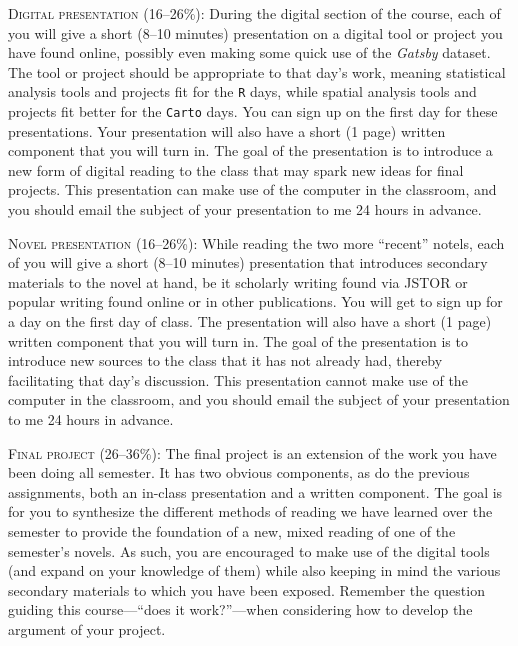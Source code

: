 \begin{description}
  \item \textsc{Digital presentation (16–26\%):} During the digital section of
    the course, each of you will give a short (8–10 minutes) presentation on a
    digital tool or project you have found online, possibly even making some
    quick use of the \textit{Gatsby} dataset. The tool or project should be
    appropriate to that day’s work, meaning statistical analysis tools and
    projects fit for the \texttt{R} days, while spatial analysis tools and
    projects fit better for the \texttt{Carto} days. You can sign up on the
    first day for these presentations. Your presentation will also have a short
    (1 page) written component that you will turn in. The goal of the
    presentation is to introduce a new form of digital reading to the class
    that may spark new ideas for final projects. This presentation can make use
    of the computer in the classroom, and you should email the subject of your
    presentation to me 24 hours in advance.

  \item \textsc{Novel presentation (16–26\%):} While reading the two more
    “recent” notels, each of you will give a short (8–10 minutes) presentation
    that introduces secondary materials to the novel at hand, be it scholarly
    writing found via JSTOR or popular writing found online or in other
    publications. You will get to sign up for a day on the first day of class.
    The presentation will also have a short (1 page) written component that you
    will turn in. The goal of the presentation is to introduce new sources to
    the class that it has not already had, thereby facilitating that day’s
    discussion. This presentation cannot make use of the computer in the
    classroom, and you should email the subject of your presentation to me 24
    hours in advance.

  \item \textsc{Final project (26–36\%):} The final project is an extension of
    the work you have been doing all semester. It has two obvious components,
    as do the previous assignments, both an in-class presentation and a written
    component. The goal is for you to synthesize the different methods of
    reading we have learned over the semester to provide the foundation of a
    new, mixed reading of one of the semester’s novels. As such, you are
    encouraged to make use of the digital tools (and expand on your knowledge
    of them) while also keeping in mind the various secondary materials to
    which you have been exposed.  Remember the question guiding this
    course—“does it work?”—when considering how to develop the argument of your
    project. 


\end{description}
